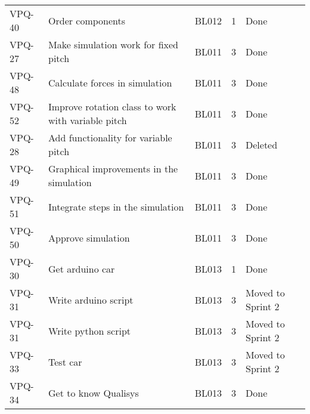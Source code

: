 \begin{table}[ht]
\begin{tabularx}{\linewidth}{|m{1.5cm} m{6.65cm} m{1.2cm} m{1.5cm} m{3.5cm}|}
            VPQ-40 & Order components & BL012 & 1\centering & Done  \\
\rowcolor{gainsboro}  VPQ-27 & Make simulation work for fixed pitch & BL011 & 3\centering & Done  \\
            VPQ-48 & Calculate forces in simulation & BL011 & 3\centering & Done \\
\rowcolor{gainsboro}  VPQ-52 & Improve rotation class to work with variable pitch & BL011 & 3\centering & Done  \\
            VPQ-28 & Add functionality for variable pitch & BL011 & 3\centering & Deleted  \\
\rowcolor{gainsboro}  VPQ-49 & Graphical improvements in the simulation & BL011 & 3\centering & Done  \\
            VPQ-51 & Integrate steps in the simulation & BL011 & 3\centering & Done  \\
\rowcolor{gainsboro}  VPQ-50 & Approve simulation & BL011 & 3\centering & Done  \\
            VPQ-30 & Get arduino car & BL013 & 1\centering & Done  \\
\rowcolor{gainsboro}  VPQ-31 & Write arduino script & BL013 & 3\centering & Moved to Sprint 2  \\
            VPQ-31 & Write python script & BL013 & 3\centering & Moved to Sprint 2  \\
\rowcolor{gainsboro}  VPQ-33 & Test car & BL013 & 3\centering & Moved to Sprint 2  \\
            VPQ-34 & Get to know Qualisys & BL013 & 3\centering & Done  \\
\hline    
\end{tabularx}
\end{table}
\newpage



